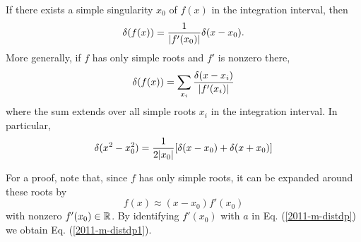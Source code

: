 If there exists a simple singularity $x_0$ of $f(x)$ in the
integration interval, then
\begin{equation}
 \delta (f(x))={1\over \vert f'(x_0)\vert }\delta(x-x_0)
.
 \end{equation}
More generally,  if $f$ has only simple roots and $f'$ is nonzero there,
\begin{equation}
 \delta (f(x))=\sum_{x_i}{\delta(x-x_i)\over \vert f'(x_i)\vert }
\label{2011-m-distdp1}
 \end{equation}
where the sum extends over all simple roots $x_i$ in
the integration interval.
In particular,
 \begin{equation}
 \delta (x^2-x_0^2)={1\over 2\vert x_0\vert }[\delta (x-x_0)+\delta
 (x+x_0)] \end{equation}
{\color{OliveGreen}
\bproof
For a proof, note that, since $f$ has only simple roots,
it can be expanded around these roots by
$$
f(x) \approx (x-x_0) f'(x_0)
$$
with nonzero $f'(x_0) \in {\Bbb R}$.
By identifying  $f'(x_0)$ with $a$ in
Eq. (\ref{2011-m-distdp})
we obtain
Eq. (\ref{2011-m-distdp1}).

\eproof
}


